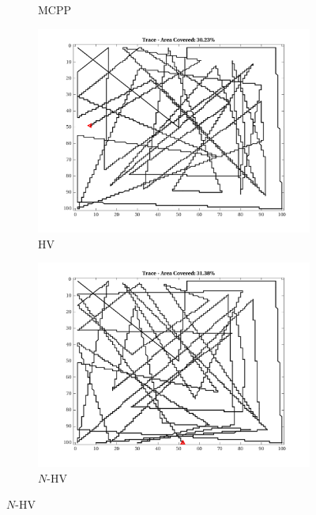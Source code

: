\begin{figure}[htb!]
\begin{subfigure}[t]{0.25\textwidth}
        \captionsetup{skip=0.20\baselineskip,size=footnotesize}
        \caption{MCPP}
    \end{subfigure}%
    \begin{subfigure}[t]{0.25\textwidth}
        \centering
        \includegraphics[width=\linewidth]{figures/path_nhv_30p_100x100_sf_50_seed_2.png}
        \captionsetup{skip=0.20\baselineskip,size=footnotesize}
        \caption{HV}
    \end{subfigure}%
    \begin{subfigure}[t]{0.25\textwidth}
        \centering
        \includegraphics[width=\linewidth]{figures/path_nnhv_30p_100x100_sf_50_seed_2.png}
        \captionsetup{skip=0.20\baselineskip,size=footnotesize}
        \caption{$N$-HV}

\end{subfigure}
\end{figure}
